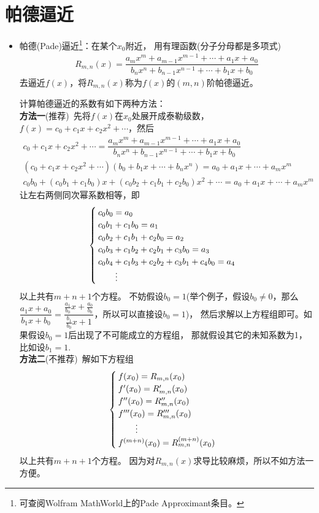 \section{帕德逼近}
\begin{itemize}[leftmargin=\inteval{\myitemleftmargin}pt,itemsep=
   \inteval{\myitemitempsep}pt,topsep=\inteval{\myitemtopsep}pt]
\item 帕德(Pade)逼近\footnote{可查阅Wolfram 
MathWorld上的Pade Approximant条目。}：在某个$ x_0 $附近，
用有理函数(分子分母都是多项式)
\begin{gather*}
    R_{m,n}(x)=\dfrac{a_mx^m+a_{m-1}x^{m-1}+\cdots+a_1x+a_0}
    {b_nx^n+b_{n-1}x^{n-1}+\cdots+b_1x+b_0}
\end{gather*}
去逼近$ f(x) $，将$ R_{m,n}(x) $称为$ f(x) $的$ (m,n) $阶帕德逼近。

计算帕德逼近的系数有如下两种方法：\\
\textbf{方法一}(推荐)\ 先将$ f(x) $在$ x_0 $处展开成泰勒级数，
$ f(x)=c_0+c_1x+c_2x^2+\cdots $，然后
\begin{gather*}
    c_0+c_1x+c_2x^2+\cdots=
    \dfrac{a_mx^m+a_{m-1}x^{m-1}+\cdots+a_1x+a_0}
    {b_nx^n+b_{n-1}x^{n-1}+\cdots+b_1x+b_0} \\
    (c_0+c_1x+c_2x^2+\cdots)(b_0+b_1x+\cdots+b_nx^n)=
    a_0+a_1x+\cdots+a_mx^m \\
    c_0b_0+(c_0b_1+c_1b_0)x+(c_0b_2+c_1b_1+c_2b_0)x^2+\cdots
    =a_0+a_1x+\cdots+a_mx^m
\end{gather*}
让左右两侧同次幂系数相等，即
\begin{align*}
    \begin{cases}
        c_0b_0=a_0 \\
        c_0b_1+c_1b_0=a_1 \\
        c_0b_2+c_1b_1+c_2b_0=a_2 \\
        c_0b_3+c_1b_2+c_2b_1+c_3b_0=a_3 \\
        c_0b_4+c_1b_3+c_2b_2+c_3b_1+c_4b_0=a_4 \\
        \quad\quad \vdots
    \end{cases}
\end{align*}
以上共有$ m+n+1 $个方程。
不妨假设$ b_0=1 $(举个例子，假设$ b_0\neq 0 $，那么
$ \dfrac{a_1x+a_0}{b_1x+b_0}=\dfrac{\frac{a_1}{b_0}x+
    \frac{a_0}{b_0}}{\frac{b_1}{b_0}x+1} $，所以可以直接设$ b_0=1 $)，
然后求解以上方程组即可。如果假设$ b_0=1 $后出现了不可能成立的方程组，
那就假设其它的未知系数为1，比如设$ b_1=1 $. \\
\textbf{方法二}(不推荐)\ 解如下方程组
\begin{align*}
    \begin{cases}
        f(x_0)=R_{m,n}(x_0) \\
        f'(x_0)=R_{m,n}'(x_0) \\
        f''(x_0)=R_{m,n}''(x_0) \\
        f'''(x_0)=R_{m,n}'''(x_0) \\
        \quad\quad\vdots \\
        f^{(m+n)}(x_0)=R_{m,n}^{(m+n)}(x_0)
    \end{cases}
\end{align*}
以上共有$ m+n+1 $个方程。
因为对$ R_{m,n}(x) $求导比较麻烦，所以不如方法一方便。


\end{itemize}
